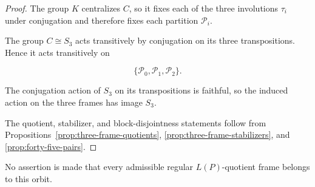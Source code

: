 \begin{proof}

The group \(K\) centralizes \(C\), so it fixes each of the three
involutions \(\tau_i\) under conjugation and therefore fixes each
partition \(\mathcal P_i\).

The group \(C\cong S_3\) acts transitively by conjugation on its three
transpositions. Hence it acts transitively on

\[
\{
\mathcal P_0,
\mathcal P_1,
\mathcal P_2
\}.
\]

The conjugation action of \(S_3\) on its transpositions is faithful, so the
induced action on the three frames has image \(S_3\).

The quotient, stabilizer, and block-disjointness statements follow from
Propositions~\ref{prop:three-frame-quotients},
\ref{prop:three-frame-stabilizers}, and
\ref{prop:forty-five-pairs}.
\end{proof}

No assertion is made that every admissible regular \(L(P)\)-quotient frame
belongs to this orbit.
